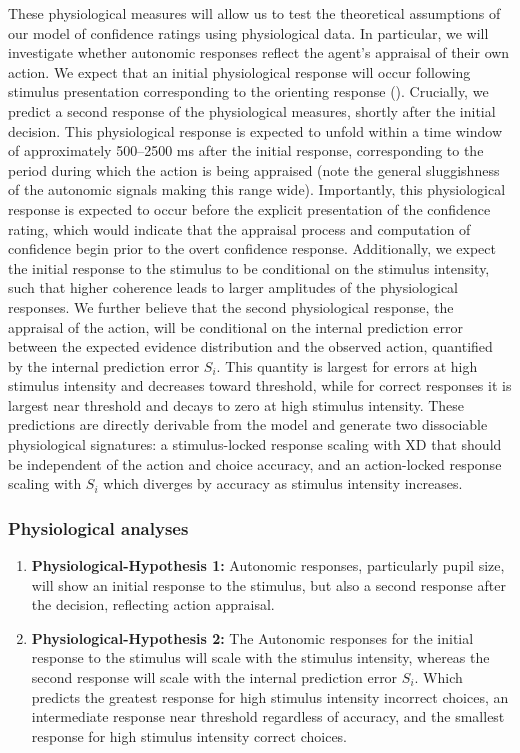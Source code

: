 \documentclass[
]{article}
\begin{document}
These physiological measures will allow us to test the theoretical
assumptions of our model of confidence ratings using physiological data.
In particular, we will investigate whether autonomic responses reflect
the agent's appraisal of their own action. We expect that an initial
physiological response will occur following stimulus presentation
corresponding to the orienting response
(). Crucially, we predict a second response of the
physiological measures, shortly after the initial decision. This
physiological response is expected to unfold within a time window of
approximately 500--2500 ms after the initial response, corresponding to
the period during which the action is being appraised (note the general
sluggishness of the autonomic signals making this range wide).
Importantly, this physiological response is expected to occur before the
explicit presentation of the confidence rating, which would indicate
that the appraisal process and computation of confidence begin prior to
the overt confidence response. Additionally, we expect the initial
response to the stimulus to be conditional on the stimulus intensity,
such that higher coherence leads to larger amplitudes of the
physiological responses. We further believe that the second
physiological response, the appraisal of the action, will be conditional
on the internal prediction error between the expected evidence
distribution and the observed action, quantified by the internal
prediction error \(S_i\). This quantity is largest for errors at high
stimulus intensity and decreases toward threshold, while for correct
responses it is largest near threshold and decays to zero at high
stimulus intensity. These predictions are directly derivable from the
model and generate two dissociable physiological signatures: a
stimulus-locked response scaling with \textbar XD\textbar{} that should
be independent of the action and choice accuracy, and an action-locked
response scaling with \(S_i\) which diverges by accuracy as stimulus
intensity increases.

\subsubsection{Physiological analyses}\label{physiological-analyses}

\begin{enumerate}
\def\labelenumi{\arabic{enumi}.}
\item
  \textbf{Physiological-Hypothesis 1:} Autonomic responses, particularly
  pupil size, will show an initial response to the stimulus, but also a
  second response after the decision, reflecting action appraisal.
\item
  \textbf{Physiological-Hypothesis 2:} The Autonomic responses for the
  initial response to the stimulus will scale with the stimulus
  intensity, whereas the second response will scale with the internal
  prediction error \(S_i\). Which predicts the greatest response for
  high stimulus intensity incorrect choices, an intermediate response
  near threshold regardless of accuracy, and the smallest response for
  high stimulus intensity correct choices.
\end{enumerate}
\end{document}
